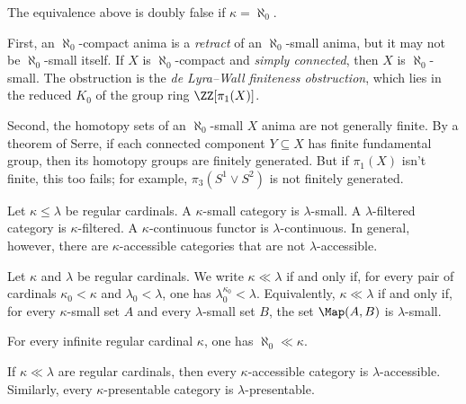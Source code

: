 \begin{eg}
	The equivalence above is doubly false if $ \kappa = \aleph_0 $.

	First, an $ \aleph_0 $-compact anima is a \emph{retract} of
	an $ \aleph_0 $-small anima, but 
	it may not be $ \aleph_0 $-small itself.
	If $ X $ is $ \aleph_0 $-compact and \emph{simply connected},
	then $ X $ is $ \aleph_0 $-small.
	The obstruction is the \emph{de Lyra--Wall finiteness obstruction},
	which lies in the reduced $ K_0 $ of the group ring $ \ZZ[\pi_1(X)] $.

	Second, the homotopy sets of an $ \aleph_0 $-small $ X $ anima
	are not generally finite.
	By a theorem of Serre,
	if each connected component $ Y \subseteq X $
	has finite fundamental group, then
	its homotopy groups are finitely generated.
	But if $ \pi_1(X) $ isn't finite,
	this too fails;
	for example, $ \pi_3(S^1 \vee S^2) $ is not finitely generated.
\end{eg}

\begin{nul}
	Let $ \kappa \leq \lambda $ be regular cardinals.
	A $ \kappa $-small category is $ \lambda $-small.
	A $ \lambda $-filtered category is $ \kappa $-filtered.
	A $ \kappa $-continuous functor is $ \lambda $-continuous.
	In general, however, there are $ \kappa $-accessible categories
	that are not $ \lambda $-accessible.
\end{nul}

\begin{definition}
	Let $ \kappa $ and $ \lambda $ be regular cardinals.
	We write $ \kappa \ll \lambda $
	if and only if,
	for every pair of cardinals
	$ \kappa_0 < \kappa $ and $ \lambda_0 < \lambda $,
	one has $ \lambda_0^{\kappa_0} < \lambda $.
	Equivalently, $ \kappa \ll \lambda $ if and only if,
	for every $ \kappa $-small set $A$
	and every $ \lambda $-small set $ B $,
	the set $ \Map(A, B) $ is $ \lambda $-small.
\end{definition}

\begin{eg}
	For every infinite regular cardinal $ \kappa $,
	one has $ \aleph_0 \ll \kappa $.
\end{eg}

\begin{nul}
	If $ \kappa \ll \lambda $ are regular cardinals,
	then every $ \kappa $-accessible category
	is $ \lambda $-accessible.
	Similarly, every $ \kappa $-presentable category
	is $ \lambda $-presentable.
\end{nul}

